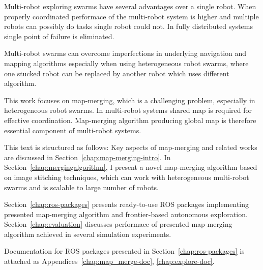 
Multi-robot exploring swarms have several advantages over a single robot. When properly coordinated performace of the multi-robot system is higher and multiple robots can possibly do tasks single robot could not. In fully distributed systems single point of failure is eliminated.

Multi-robot swarms can overcome imperfections in underlying navigation and mapping algorithms especially when using heterogeneous robot swarms, where one stucked robot can be replaced by another robot which uses different algorithm.

This work focuses on map-merging, which is a challenging problem, especially in heterogeneous robot swarms. In multi-robot systems shared map is required for effective coordination. Map-merging algorithm producing global map is therefore essential component of multi-robot systems.

This text is structured as follows: Key aspects of map-merging and related works are discussed in Section~\ref{chap:map-merging-intro}. In Section~\ref{chap:mergingalgorithm}, I present a novel map-merging algorithm based on image stitching techniques, which can work with heterogeneous multi-robot swarms and is scalable to large number of robots.

Section~\ref{chap:ros-packages} presents ready-to-use \gls{ROS} packages implementing presented map-merging algorithm and frontier-based autonomous exploration. Section~\ref{chap:evaluation} discusses performace of presented map-merging algorithm achieved in several simulation experiments.

Documentation for \gls{ROS} packages presented in Section~\ref{chap:ros-packages} is attached as Appendices~\ref{chap:map_merge-doc}, \ref{chap:explore-doc}.
